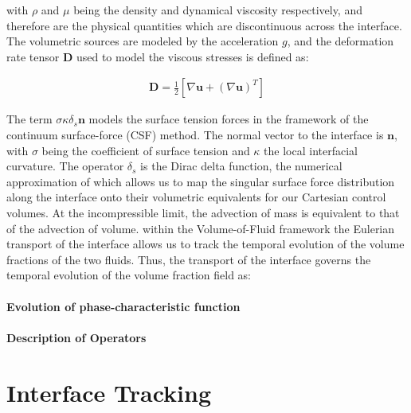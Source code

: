 with $\rho$ and $\mu$ being the density and dynamical viscosity respectively, and therefore are the physical quantities which are discontinuous across the interface. The volumetric sources are modeled by the acceleration $g$, and the deformation rate tensor $\boldsymbol{D}$ used to model the viscous stresses is defined as:  

\begin{align}
	\boldsymbol{D} = \frac{1}{2}\left[\nabla \boldsymbol{u} + \left(\nabla \boldsymbol{u}\right)^{T}\right]  
\end{align}


The term $\sigma \kappa \delta_{s}\boldsymbol{n}$ models the surface tension forces in the 
framework of the continuum surface-force (CSF) method. The normal vector to the interface 
is $\boldsymbol{n}$, with $\sigma$ being the coefficient of surface tension and $\kappa$ the 
local interfacial curvature. The operator $\delta_{s}$ is the Dirac delta function, 
the numerical approximation of which allows us to map the singular surface force distribution
along the interface onto their volumetric equivalents for our Cartesian control volumes. 
At the incompressible limit, the advection of mass is equivalent to that of the advection of volume.
within the Volume-of-Fluid framework the Eulerian transport of the interface allows us to track the temporal evolution of the volume fractions of the two fluids. Thus, the transport of the interface governs the temporal evolution of the volume fraction field as: 


\paragraph{Evolution of phase-characteristic function}
\blindtext





\paragraph{Description of Operators}
\blindtext







\section{Interface Tracking}

